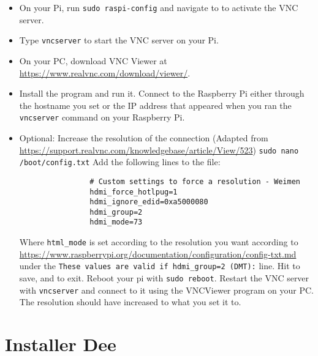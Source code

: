 \documentclass{article}
\begin{document}
		\begin{itemize}
			\item On your Pi, run \verb|sudo raspi-config| and navigate to  to activate the VNC server.
			\item Type \verb|vncserver| to start the VNC server on your Pi. 
			\item On your PC, download VNC Viewer at \url{https://www.realvnc.com/download/viewer/}.
			\item Install the program and run it. Connect to the Raspberry Pi either through the hostname you set or the IP address that appeared when you ran the \verb|vncserver| command on your Raspberry Pi.
			\item Optional: Increase the resolution of the connection (Adapted from \url{https://support.realvnc.com/knowledgebase/article/View/523})
			\subitem \verb|sudo nano /boot/config.txt|
			\subitem Add the following lines to the file:
			\begin{verbatim}
				# Custom settings to force a resolution - Weimen
				hdmi_force_hotlpug=1
				hdmi_ignore_edid=0xa5000080
				hdmi_group=2
				hdmi_mode=73
			\end{verbatim}
			Where \verb|html_mode| is set according to the resolution you want according to \url{https://www.raspberrypi.org/documentation/configuration/config-txt.md} under the \verb|These values are valid if hdmi_group=2 (DMT):| line.
			\subitem Hit  to save, and  to exit.
			\subitem Reboot your pi with \verb|sudo reboot|.
			\subitem Restart the VNC server with \verb|vncserver| and connect to it using the VNCViewer program on your PC. The resolution should have increased to what you set it to.
			
		\end{itemize}
		
		\section{Installer Dee}
		
		

		
	

	\begin{versionhistory}
	\end{versionhistory}
		
		
\end{document}
